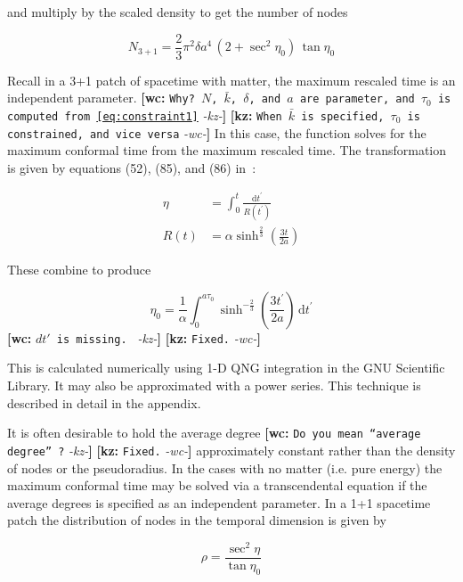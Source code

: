 \documentclass[preprint,notitlepage,amsmath,amssymb,floatfix]{revtex4-1}
\newcommand{\XXX}[3]{{\bf [#1: } {\tt #3} {\it -#2-}{\bf ]}}
\begin{document}
\noindent and multiply by the scaled density to get the number of nodes

\begin{equation}
\label{eq:finalN3}
N_{\mathrm{3+1}} = \frac{2}{3}\pi^2\delta a^4\,\left(2+\sec^2\eta_0\right)\,\tan\eta_0
\end{equation}

\noindent Recall in a 3+1 patch of spacetime with matter, the maximum rescaled time is an independent parameter. \XXX{wc}{kz}{Why? $N$, $\bar{k}$, $\delta$, and $a$ are parameter, and $\tau_0$ is computed from~\eqref{eq:constraint1}} \XXX{kz}{wc}{When $\bar{k}$ is specified, $\tau_0$ is constrained, and vice versa}
In this case, the function solves for the maximum conformal time from the maximum rescaled time.
The transformation is given by equations (52), (85), and (86) in~\cite{ref:snc2012}:

\begin{align}
\eta &= \int_0^t\!\frac{\mathrm dt^\prime}{R\left(t^\prime\right)} \label{eq:t_to_eta}\\
R\left(t\right) &= \alpha\sinh^{\frac{2}{3}}\left(\frac{3t}{2a}\right) \label{eq:scale_factor}
\end{align}

\noindent These combine to produce

\begin{equation}
\eta_0 = \frac{1}{\alpha}\int_0^{a\tau_0}\!\sinh^{-\frac{2}{3}}\left(\frac{3t^\prime}{2a}\right)\,\mathrm dt^\prime
\end{equation}
\XXX{wc}{kz}{$dt'$ is missing. } \XXX{kz}{wc}{Fixed.}

\noindent This is calculated numerically using 1-D QNG integration in the GNU Scientific Library.  It may also be approximated with a power series.  This technique is described in detail in the appendix. \par
It is often desirable to hold the average degree \XXX{wc}{kz}{Do you mean ``average degree'' ?} \XXX{kz}{wc}{Fixed.} approximately constant rather than the density of nodes or the pseudoradius.  
In the cases with no matter (i.e. pure energy) the maximum conformal time may be solved via a transcendental equation if the average degrees is specified as an independent parameter.
In a 1+1 spacetime patch the distribution of nodes in the temporal dimension is given by

\begin{equation}
\rho = \frac{\sec^2\eta}{\tan\eta_0}
\end{equation}
\end{document}
